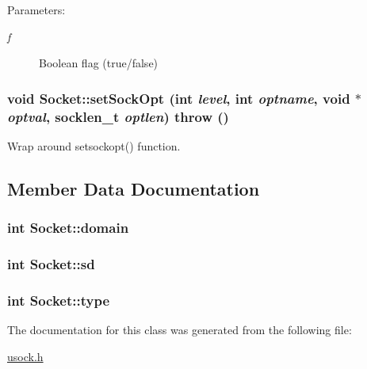 \begin{Desc}
\item[Parameters:]
\begin{description}
\item[{\em f}]Boolean flag (true/false) \end{description}
\end{Desc}
\hypertarget{classSocket_5930d6cd7bc34b6de1126b80aad7bedd}{
\subsubsection[{setSockOpt}]{\setlength{\rightskip}{0pt plus 5cm}void Socket::setSockOpt (int {\em level}, \/  int {\em optname}, \/  void $\ast$ {\em optval}, \/  socklen\_\-t {\em optlen})  throw ()}}
\label{classSocket_5930d6cd7bc34b6de1126b80aad7bedd}


Wrap around setsockopt() function. 



\subsection{Member Data Documentation}
\hypertarget{classSocket_8b042d9fe02795041a5e045604c8b7ec}{
\subsubsection[{domain}]{\setlength{\rightskip}{0pt plus 5cm}int {\bf Socket::domain}}}
\label{classSocket_8b042d9fe02795041a5e045604c8b7ec}


\hypertarget{classSocket_d9e40b6c9a69e0168c27962cc6c60ef7}{
\subsubsection[{sd}]{\setlength{\rightskip}{0pt plus 5cm}int {\bf Socket::sd}}}
\label{classSocket_d9e40b6c9a69e0168c27962cc6c60ef7}


\hypertarget{classSocket_c7f6980f36023df2004271c336217cb8}{
\subsubsection[{type}]{\setlength{\rightskip}{0pt plus 5cm}int {\bf Socket::type}}}
\label{classSocket_c7f6980f36023df2004271c336217cb8}




The documentation for this class was generated from the following file:\begin{CompactItemize}
\item 
\hyperlink{usock_8h}{usock.h}\end{CompactItemize}
